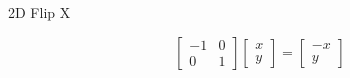 \documentclass{beamer}
\begin{document}
\begin{frame}{2D Flip X}

\[ \left[ \begin{array}{cc} -1 & 0 \\ 0 & 1 \end{array} \right] \left[ \begin{array}{c} x \\ y \end{array} \right] =  \left[ \begin{array}{c} -x \\ y \end{array} \right] \]

\begin{figure}[t]
    \captionsetup[subfloat]{labelformat=empty}
	\centering
\end{figure}

\end{frame}
\end{document}
